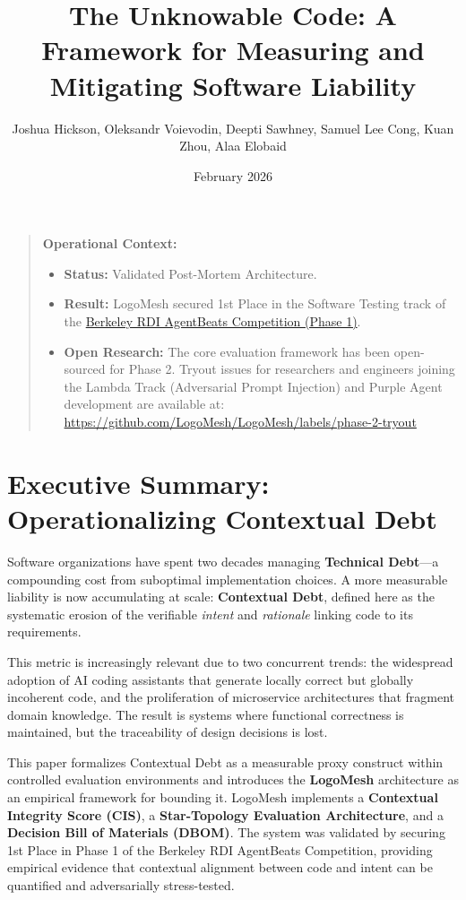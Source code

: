 \documentclass[11pt, a4paper]{article}
\title{The Unknowable Code: A Framework for Measuring and Mitigating Software Liability}
\author{Joshua Hickson, Oleksandr Voievodin, Deepti Sawhney, Samuel Lee Cong, Kuan Zhou, Alaa Elobaid}
\date{February 2026}
\begin{document}
\maketitle

\begin{quote}
\textbf{Operational Context:}
\begin{itemize}[leftmargin=*]
  \item \textbf{Status:} Validated Post-Mortem Architecture.
  \item \textbf{Result:} LogoMesh secured 1st Place in the Software Testing track of the \href{https://rdi.berkeley.edu/agentx-agentbeats}{Berkeley RDI AgentBeats Competition (Phase 1)}.
  \item \textbf{Open Research:} The core evaluation framework has been open-sourced for Phase 2. Tryout issues for researchers and engineers joining the Lambda Track (Adversarial Prompt Injection) and Purple Agent development are available at: \url{https://github.com/LogoMesh/LogoMesh/labels/phase-2-tryout}
\end{itemize}
\end{quote}

\section{Executive Summary: Operationalizing Contextual Debt}

Software organizations have spent two decades managing \textbf{Technical Debt}—a compounding cost from suboptimal implementation choices. A more measurable liability is now accumulating at scale: \textbf{Contextual Debt}, defined here as the systematic erosion of the verifiable \emph{intent} and \emph{rationale} linking code to its requirements.

This metric is increasingly relevant due to two concurrent trends: the widespread adoption of AI coding assistants that generate locally correct but globally incoherent code, and the proliferation of microservice architectures that fragment domain knowledge. The result is systems where functional correctness is maintained, but the traceability of design decisions is lost.

This paper formalizes Contextual Debt as a measurable proxy construct within controlled evaluation environments and introduces the \textbf{LogoMesh} architecture as an empirical framework for bounding it. LogoMesh implements a \textbf{Contextual Integrity Score (CIS)}, a \textbf{Star-Topology Evaluation Architecture}, and a \textbf{Decision Bill of Materials (DBOM)}. The system was validated by securing 1st Place in Phase 1 of the Berkeley RDI AgentBeats Competition, providing empirical evidence that contextual alignment between code and intent can be quantified and adversarially stress-tested.
\end{document}
